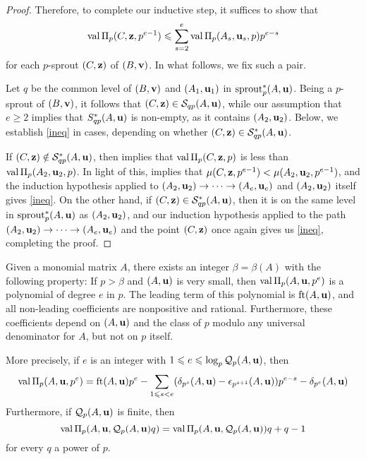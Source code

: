 \documentclass[11pt]{amsart}
\renewcommand{\S}{\mathcal{S}}
\begin{document}
\begin{proof}
Therefore, to complete our inductive step, it suffices to show that
    \begin{equation}\label{ineq}
        \operatorname{val} \Pi_p(C,\mathbf{z},p^{e-1}) \leqslant \sum_{s=2}^e \operatorname{val} \Pi_p(A_s,\mathbf{u}_s,p) p^{e-s} 
    \end{equation}
    for each $p$-sprout $(C,\mathbf{z})$ of $(B,\mathbf{v})$.  In what follows, we fix such a pair.
    
    Let $q$ be the common level of $(B,\mathbf{v})$ and $(A_1, \mathbf{u}_1)$ in $\operatorname{sprout}^{\ast}_p(A,\mathbf{u})$.  Being a $p$-sprout of $(B,\mathbf{v})$, it follows that $(C,\vv{z}) \in \S_{qp}(A,\vv{u})$, while our assumption that $e \geq 2$ implies that $S^{\ast}_{qp}(A,\mathbf{u})$ is non-empty, as it contains $(A_2, \mathbf{u}_2)$.  Below, we establish \eqref{ineq} in cases, depending on whether $(C,\vv{z}) \in \S^{\ast}_{qp}(A,\vv{u})$.
    
    If $(C,\vv{z}) \notin \S^{\ast}_{qp}(A,\vv{u})$, then  implies that $\operatorname{val} \Pi_p(C,\mathbf{z}, p)$ is less than $\operatorname{val} \Pi_p(A_2, \mathbf{u}_2, p)$.  In light of this,  implies that $\mu(C, \mathbf{z},p^{e-1}) < \mu(A_2,\mathbf{u}_2, p^{e-1})$, and the induction hypothesis applied to $(A_2, \mathbf{u}_2) \to \cdots \to (A_e, \mathbf{u}_e)$ and $(A_2,\mathbf{u}_2)$ itself gives \eqref{ineq}.
    On the other hand, if $(C, \vv{z}) \in \S^{\ast}_{qp}(A,\vv{u})$, then it is on the same level in $\operatorname{sprout}_p^{\ast}(A,\mathbf{u})$ as $(A_2, \mathbf{u}_2)$, and  our induction hypothesis applied to the path $(A_2, \mathbf{u}_2) \to \cdots \to (A_e, \mathbf{u}_e)$ and the point $(C, \mathbf{z})$ once again gives us \eqref{ineq}, completing the proof.
\end{proof}



\begin{theorem}
\label{main theorem wrt diagonal: T}
  Given a monomial matrix $A$, there exists an integer $\beta = \beta(A)$ with the following property:   If $p > \beta$ and $(A,\mathbf{u})$ is very small, then $\operatorname{val} \Pi_p(A,\mathbf{u},p^e)$ is a polynomial of degree $e$ in $p$.  The leading term of this polynomial is $\operatorname{ft}(A, \mathbf{u})$, and all non-leading coefficients are nonpositive and rational.  Furthermore, these coefficients depend on $(A,\mathbf{u})$ and the class of $p$ modulo any universal denominator for $A$, but not on $p$ itself.  

More precisely, if $e$ is an integer with $1 \leqslant e \leqslant \log_p \mathcal{Q}_p(A,\mathbf{u})$, then 
%
\[ \operatorname{val} \Pi_p(A,\mathbf{u}, p^e) =  \operatorname{ft}(A, \mathbf{u})  p^e - \sum_{1 \leqslant s < e} ( \delta_{p^s}(A,\mathbf{u}) - \epsilon_{p^{s+1}}(A,\mathbf{u}))  p^{e-s} - \delta_{p^e}(A,\mathbf{u})  \] 
%
Furthermore, if $\mathcal{Q}_p(A,\mathbf{u})$ is finite, then
%
\[ \operatorname{val} \Pi_p(A,\mathbf{u}, \mathcal{Q}_p(A,\mathbf{u})  q) = \operatorname{val} \Pi_p(A,\mathbf{u}, \mathcal{Q}_p(A,\mathbf{u}))  q + q-1 \] for every $q$ a power of $p$.
\end{theorem}
\end{document}
